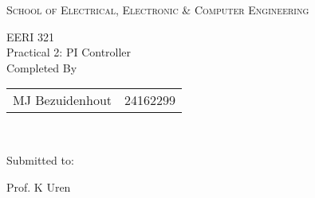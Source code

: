

\begin{titlepage}



\begin{center}
\large

\hfill
\vfill
\vspace{5mm}

\begingroup
\Huge{\textsc{School of Electrical, Electronic \& Computer Engineering}} \\ \bigskip %

\Huge{EERI 321}\\
\Large{Practical 2: PI Controller}\\
\endgroup
\vspace{15mm}
\Large{Completed By} \\

 \begin{tabular}{l  r} 
 MJ Bezuidenhout & 24162299 \\

 \end{tabular}			\\
 
\vfill

Submitted to:\\
\vspace{8mm}




{Prof. K Uren}\\
\vfill



\myTime

			
\vspace*{0.8cm}

\vfill

\end{center}

\end{titlepage}
